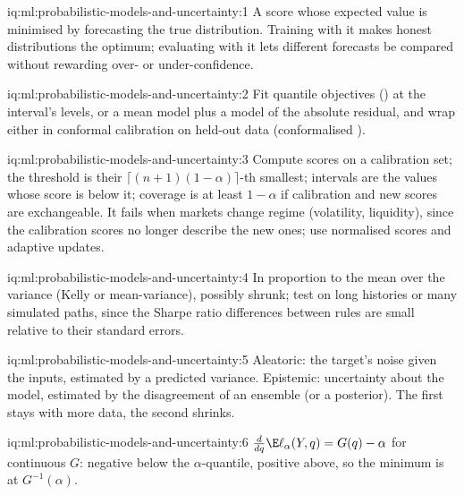
\begin{solution}{iq:ml:probabilistic-models-and-uncertainty:1}
A score whose expected value is minimised by forecasting the true distribution. Training with it makes honest
distributions the optimum; evaluating with it lets different forecasts be compared without rewarding over- or
under-confidence.
\end{solution}

\begin{solution}{iq:ml:probabilistic-models-and-uncertainty:2}
Fit quantile objectives () at the interval's levels, or a mean model plus a model of the absolute residual,
and wrap either in conformal calibration on held-out data (conformalised ).
\end{solution}

\begin{solution}{iq:ml:probabilistic-models-and-uncertainty:3}
Compute scores on a calibration set; the threshold is their $\lceil(n+1)(1-\alpha)\rceil$-th smallest; intervals are the
values whose score is below it; coverage is at least $1 - \alpha$ if calibration and new scores are exchangeable. It
fails when markets change regime (volatility, liquidity), since the calibration scores no longer describe the new ones;
use normalised scores and adaptive updates.
\end{solution}

\begin{solution}{iq:ml:probabilistic-models-and-uncertainty:4}
In proportion to the mean over the variance (Kelly or mean-variance), possibly shrunk; test on long histories or many
simulated paths, since the Sharpe ratio differences between rules are small relative to their standard errors.
\end{solution}

\begin{solution}{iq:ml:probabilistic-models-and-uncertainty:5}
Aleatoric: the target's noise given the inputs, estimated by a predicted variance. Epistemic: uncertainty about the
model, estimated by the disagreement of an ensemble (or a posterior). The first stays with more data, the second shrinks.
\end{solution}

\begin{solution}{iq:ml:probabilistic-models-and-uncertainty:6}
$\frac{d}{dq}\E\ell_\alpha(Y, q) = G(q) - \alpha$ for continuous $G$: negative below the $\alpha$-quantile, positive above, so
the minimum is at $G^{-1}(\alpha)$.
\end{solution}
